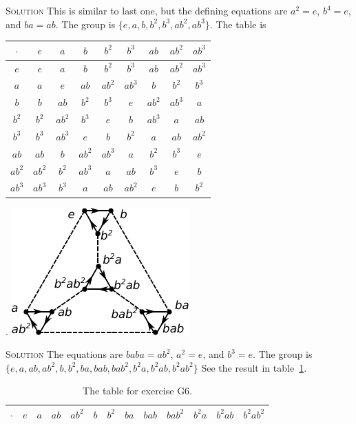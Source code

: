 \documentclass[twoside]{amsart}
\newcommand{\solution}{\textsc{Solution}\xspace}
\begin{document}
\begin{enumerate}[A.]
    \noindent \solution This is similar to last one, but the 
    defining equations are $a^2=e$, $b^4=e$, and $ba=ab$. The 
    group is $\{e,a,b,b^2,b^3,ab^2,ab^3\}$. The table is

    \begin{center}
    \begin{tabular}{c|cccccccc}
    $\cdot$  & $e$ & $a$ & $b$ & $b^2$ & $b^3$ & $ab$ & $ab^2$ & $ab^3$\\\hline
    $e$      & $e$ & $a$ & $b$ & $b^2$ & $b^3$ & $ab$ & $ab^2$ & $ab^3$\\
    $a$      & $a$ & $e$ & $ab$ & $ab^2$ & $ab^3$ & $b$ & $b^2$ & $b^3$\\
    $b$      & $b$ & $ab$ & $b^2$ & $b^3$ & $e$ & $ab^2$ & $ab^3$ & $a$\\
    $b^2$    & $b^2$ & $ab^2$ & $b^3$ & $e$ & $b$ & $ab^3$ & $a$ & $ab$\\
    $b^3$    & $b^3$ & $ab^3$ & $e$ & $b$ & $b^2$ & $a$ & $ab$ & $ab^2$\\
    $ab$     & $ab$ & $b$ & $ab^2$ & $ab^3$ & $a$ & $b^2$ & $b^3$ & $e$\\
    $ab^2$   & $ab^2$ & $b^2$ & $ab^3$ & $a$ & $ab$ & $b^3$ & $e$ & $b$\\
    $ab^3$   & $ab^3$ & $b^3$ & $a$ & $ab$ & $ab^2$ & $e$ & $b$ & $b^2$
    \end{tabular}
    \end{center}

    . \includegraphics{img/chap5g6.pdf}

    \noindent \solution The equations are $baba = ab^2$, $a^2=e$, and $b^3=e$. 
    The group is $\{e,a,ab,ab^2,b,b^2,ba,bab,bab^2,b^2a,b^2ab,b^2ab^2\}$ 
    See the result in table~\ref{tab:g6}.
\begin{table}
\caption{The table for exercise G6.}
\label{tab:g6}
\begin{tabular}{c|cccccccccccc}
$\cdot$ & $e$ & $a$ & $ab$ & $ab^2$ & $b$ & $b^2$ & $ba$ & $bab$ & $bab^2$ &
   $b^2a$ & $b^2ab$ & $b^2ab^2$ \\\hline


\end{tabular}
\end{table}
\end{enumerate}
\end{document}
